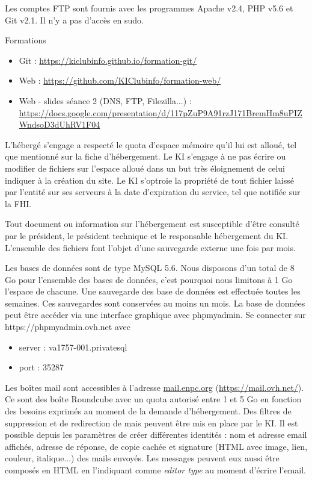\documentclass{ki019}
\begin{document}
Les comptes FTP sont fournis avec les programmes Apache v2.4, PHP v5.6 et Git v2.1. Il n'y a pas d'accès en sudo.

Formations
\begin{itemize}
\item Git : \url{https://kiclubinfo.github.io/formation-git/}
\item Web : \url{https://github.com/KIClubinfo/formation-web/}
\item Web - slides séance 2 (DNS, FTP, Filezilla...) : \\
\url{https://docs.google.com/presentation/d/117pZuP9A91rzJ171BremHm8uPIZWndsoD3dUhRV1F04}
\end{itemize}


L'hébergé s'engage a respecté le quota d'espace mémoire qu'il lui est alloué, tel que mentionné sur la fiche d'hébergement.
Le KI s'engage à ne pas écrire ou modifier de fichiers sur l'espace alloué dans un but très éloignement de celui indiquer à la création du site.
Le KI s'optroie la propriété de tout fichier laissé par l'entité sur ses serveurs à la date d'expiration du service, tel que notifiée sur la FHI.


Tout document ou information sur l'hébergement est susceptible d'être consulté par le président, le président technique et le responsable hébergement du KI.
L'ensemble des fichiers font l'objet d'une sauvegarde externe une fois par mois.


Les bases de données sont de type MySQL 5.6. Nous disposons d'un total de 8 Go pour l'ensemble des bases de données, c'est pourquoi nous limitons à 1 Go l'espace de chacune.
Une sauvegarde des base de données est effectuée toutes les semaines. Ces sauvegardes sont conservées au moins un mois.
La base de données peut être accéder via une interface graphique avec phpmyadmin.
Se connecter sur https://phpmyadmin.ovh.net avec
\begin{itemize}
\item server : va1757-001.privatesql
\item port : 35287
\end{itemize}


Les boîtes mail sont accessibles à l'adresse \url{mail.enpc.org} (\url{https://mail.ovh.net/}).
Ce sont des boîte Roundcube avec un quota autorisé entre 1 et 5 Go en fonction des besoins exprimés au moment de la demande d'hébergement.
Des filtres de suppression et de redirection de mais peuvent être mis en place par le KI.
Il est possible depuis les paramètres de créer différentes identités : nom et adresse email affichés, adresse de réponse, de copie cachée et signature (HTML avec image, lien, couleur, italique...) des mails envoyés.
Les messages peuvent eux aussi être composés en HTML en l'indiquant comme \textit{editor type} au moment d'écrire l'email.
\end{document}
